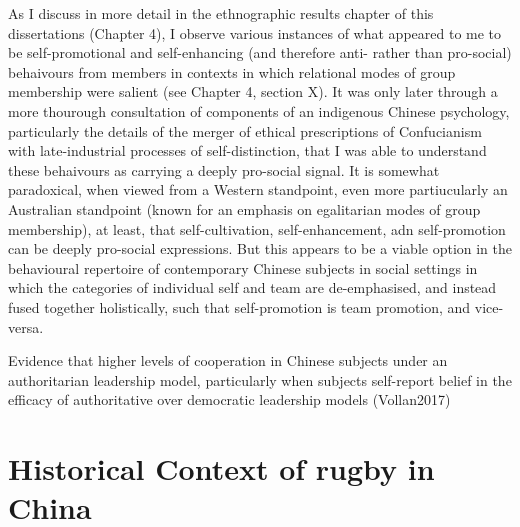 {  As I discuss in more detail in the ethnographic results chapter of this dissertations (Chapter 4), I observe various instances of what appeared to me to be self-promotional and self-enhancing (and therefore anti- rather than pro-social) behaivours from members in contexts in which relational modes of group membership were salient (see Chapter 4, section X).  It was only later through a more thourough consultation of components of an indigenous Chinese psychology, particularly the details of the merger of ethical prescriptions of Confucianism with late-industrial processes of self-distinction, that I was able to understand these behaivours as carrying a deeply pro-social signal.  It is somewhat paradoxical, when viewed from a Western standpoint, even more partiucularly an Australian standpoint (known for an emphasis on egalitarian modes of group membership), at least, that self-cultivation, self-enhancement, adn self-promotion can be deeply pro-social expressions.  But this appears to be a viable option in the behavioural repertoire of contemporary Chinese subjects in social settings in which the categories of individual self and team are de-emphasised, and instead fused together holistically, such that self-promotion is team promotion, and vice-versa.

  Evidence that higher levels of cooperation in Chinese subjects under an authoritarian leadership model, particularly when subjects self-report belief in the efficacy of authoritative over democratic leadership models (Vollan2017)














\section{Historical Context of rugby in China}

}
